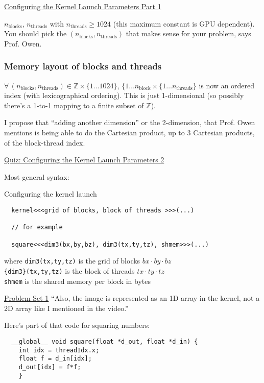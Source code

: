 \documentclass[10pt]{amsart}
\begin{document}
\begin{multicols*}{2}
\href{https://classroom.udacity.com/courses/cs344/lessons/55120467/concepts/670742980923}{Configuring the Kernel Launch Parameters Part 1}

$n_{\text{blocks}}$, $n_{\text{threads}}$ with $n_{\text{threads}} \geq 1024$ (this maximum constant is GPU dependent).  You should pick the $(n_{\text{blocks}}, n_{\text{threads}})$ that makes sense for your problem, says Prof. Owen.  

\subsubsection{Memory layout of blocks and threads}

$\forall \, (n_{\text{blocks}}, n_{\text{threads}}) \in \mathbb{Z} \times \lbrace 1 \dots 1024 \rbrace$, $\lbrace 1 \dots n_{\text{block}} \times \lbrace 1 \dots n_{\text{threads}} \rbrace$ is now an ordered index (with lexicographical ordering).  This is just 1-dimensional (so possibly there's a 1-to-1 mapping to a finite subset of $\mathbb{Z}$).

I propose that ``adding another dimension'' or the 2-dimension, that Prof. Owen mentions is being able to do the Cartesian product, up to 3 Cartesian products, of the block-thread index.  

\href{https://classroom.udacity.com/courses/cs344/lessons/55120467/concepts/668398860923}{Quiz: Configuring the Kernel Launch Parameters 2 }

Most general syntax:

Configuring the kernel launch
\begin{lstlisting}
  kernel<<<grid of blocks, block of threads >>>(...)

  // for example

  square<<<dim3(bx,by,bz), dim3(tx,ty,tz), shmem>>>(...)
  \end{lstlisting}
where \verb|dim3(tx,ty,tz)| is the grid of blocks $bx\cdot by \cdot bz$ \\
\phantom{ where } \verb|{dim3}(tx,ty,tz)| is the block of threads $tx \cdot ty \cdot tz$ \\
\phantom{ where } \verb|shmem| is the shared memory per block in bytes


\href{https://classroom.udacity.com/courses/cs344/lessons/55120467/concepts/967066740923}{Problem Set 1}
``Also, the image is represented as an 1D array in the kernel, not a 2D array like I mentioned in the video.''

Here's part of that code for squaring numbers:
\begin{lstlisting}
  __global__ void square(float *d_out, float *d_in) {
    int idx = threadIdx.x;
    float f = d_in[idx];
    d_out[idx] = f*f;
    }
  \end{lstlisting}


\end{multicols*}
\end{document}
